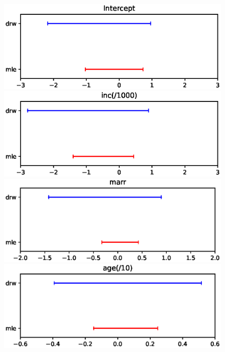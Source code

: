 \documentclass{article}
\begin{document}
\begin{figure}
\centering
\begin{minipage}{0.48\linewidth}
\includegraphics[width=\linewidth]{0.eps}
\end{minipage}
\begin{minipage}{0.48\linewidth}
\includegraphics[width=\linewidth]{1.eps}
\end{minipage}
\begin{minipage}{0.48\linewidth}
\includegraphics[width=\linewidth]{2.eps}
\end{minipage}
\begin{minipage}{0.48\linewidth}
\includegraphics[width=\linewidth]{3.eps}

\end{minipage}
\end{figure}
\end{document}
